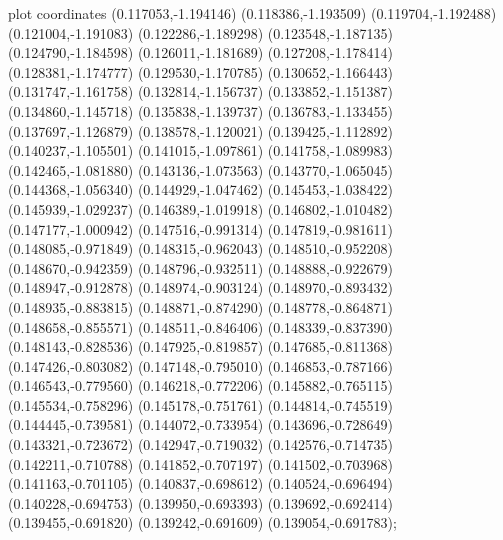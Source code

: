 { plot coordinates {(0.117053,-1.194146) (0.118386,-1.193509) (0.119704,-1.192488) (0.121004,-1.191083) (0.122286,-1.189298) (0.123548,-1.187135) (0.124790,-1.184598) (0.126011,-1.181689) (0.127208,-1.178414) (0.128381,-1.174777) (0.129530,-1.170785) (0.130652,-1.166443) (0.131747,-1.161758) (0.132814,-1.156737) (0.133852,-1.151387) (0.134860,-1.145718) (0.135838,-1.139737) (0.136783,-1.133455) (0.137697,-1.126879) (0.138578,-1.120021) (0.139425,-1.112892) (0.140237,-1.105501) (0.141015,-1.097861) (0.141758,-1.089983) (0.142465,-1.081880) (0.143136,-1.073563) (0.143770,-1.065045) (0.144368,-1.056340) (0.144929,-1.047462) (0.145453,-1.038422) (0.145939,-1.029237) (0.146389,-1.019918) (0.146802,-1.010482) (0.147177,-1.000942) (0.147516,-0.991314) (0.147819,-0.981611) (0.148085,-0.971849) (0.148315,-0.962043) (0.148510,-0.952208) (0.148670,-0.942359) (0.148796,-0.932511) (0.148888,-0.922679) (0.148947,-0.912878) (0.148974,-0.903124) (0.148970,-0.893432) (0.148935,-0.883815) (0.148871,-0.874290) (0.148778,-0.864871) (0.148658,-0.855571) (0.148511,-0.846406) (0.148339,-0.837390) (0.148143,-0.828536) (0.147925,-0.819857) (0.147685,-0.811368) (0.147426,-0.803082) (0.147148,-0.795010) (0.146853,-0.787166) (0.146543,-0.779560) (0.146218,-0.772206) (0.145882,-0.765115) (0.145534,-0.758296) (0.145178,-0.751761) (0.144814,-0.745519) (0.144445,-0.739581) (0.144072,-0.733954) (0.143696,-0.728649) (0.143321,-0.723672) (0.142947,-0.719032) (0.142576,-0.714735) (0.142211,-0.710788) (0.141852,-0.707197) (0.141502,-0.703968) (0.141163,-0.701105) (0.140837,-0.698612) (0.140524,-0.696494) (0.140228,-0.694753) (0.139950,-0.693393) (0.139692,-0.692414) (0.139455,-0.691820) (0.139242,-0.691609) (0.139054,-0.691783)};
}
